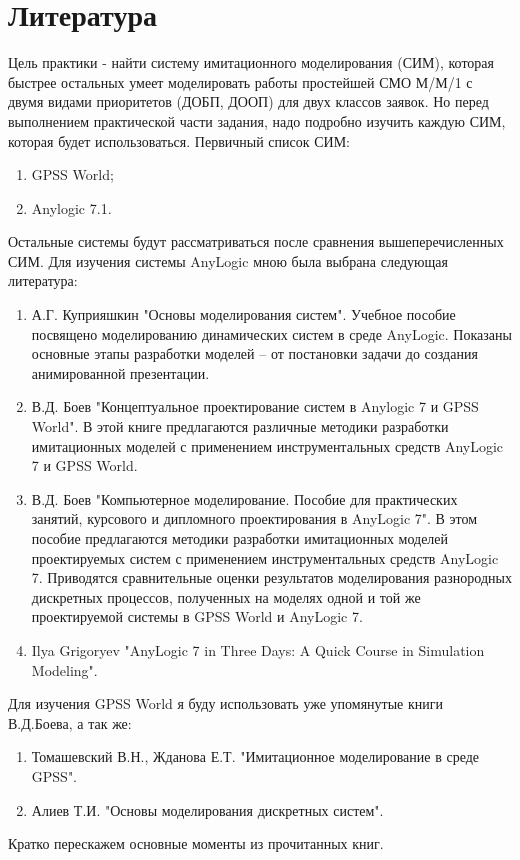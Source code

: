 \documentclass[a4paper,14pt]{report} %
\begin{document}
\chapter{Литература}
Цель практики - найти систему имитационного моделирования (СИМ), которая быстрее остальных умеет моделировать работы простейшей СМО М/М/1 с двумя видами приоритетов (ДОБП, ДООП) для двух классов заявок. Но перед выполнением практической части задания, надо подробно изучить каждую СИМ, которая будет использоваться. Первичный список СИМ: 
\begin{enumerate} %
\item GPSS World;
\item Anylogic 7.1.
\end{enumerate}
Остальные системы будут рассматриваться после сравнения вышеперечисленных СИМ.
Для изучения системы AnyLogic мною была выбрана следующая литература:
\begin{enumerate} %
\item А.Г. Куприяшкин "Основы моделирования систем". Учебное пособие посвящено моделированию динамических систем в среде AnyLogic. Показаны основные этапы разработки моделей – от постановки задачи до создания анимированной презентации.
\item В.Д. Боев "Концептуальное проектирование систем в Anylogic 7 и GPSS World". В этой книге предлагаются различные методики разработки имитационных моделей с применением инструментальных средств AnyLogic 7 и GPSS World.
\item В.Д. Боев  "Компьютерное моделирование. Пособие для практических занятий, курсового и дипломного проектирования в AnyLogic 7". В этом пособие предлагаются методики разработки имитационных моделей проектируемых систем с применением инструментальных средств AnyLogic 7. Приводятся сравнительные оценки результатов моделирования разнородных дискретных процессов, полученных на моделях одной и той же проектируемой системы в GPSS World и AnyLogic 7.
\item Ilya Grigoryev "AnyLogic 7 in Three Days: A Quick Course in Simulation Modeling".
\end{enumerate}
Для изучения GPSS World я буду использовать уже упомянутые книги В.Д.Боева, а так же: 
\begin{enumerate} %
\item Томашевский В.Н., Жданова Е.Т. "Имитационное моделирование в среде GPSS".
\item Алиев Т.И. "Основы моделирования дискретных систем".
\end{enumerate}
Кратко перескажем основные моменты из прочитанных книг.
\end{document}
